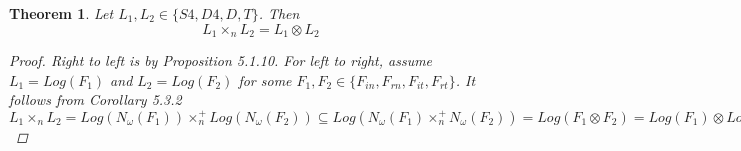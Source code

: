 \documentclass[12pt, a4paper]{scrartcl}
\newtheorem{theorem}[definition]{Theorem}
\begin{document}
    \clearpage

    \begin{theorem}
        Let $L_1, L_2 \in \{S4, D4, D, T\}$. Then 
        $$L_1 \times_n L_2 = L_1 \otimes L_2$$

        \begin{proof}
            Right to left is by Proposition 5.1.10. \newline
            For left to right, assume $L_1 = Log(F_1)$ and $L_2 = Log(F_2)$ for some $F_1, F_2 \in \{F_{in}, F_{rn}, F_{it}, F_{rt}\}$.
            It follows from Corollary 5.3.2 \newline
            $L_1 \times_n L_2 = Log(N_\omega(F_1)) \times^+_n Log(N_\omega(F_2)) \subseteq Log(N_\omega(F_1) \times^+_n N_\omega(F_2)) = Log(F_1 \otimes F_2) = Log(F_1) \otimes Log(F_2) = L_1 \otimes L_2$
        \end{proof}
    \end{theorem}
\end{document}
